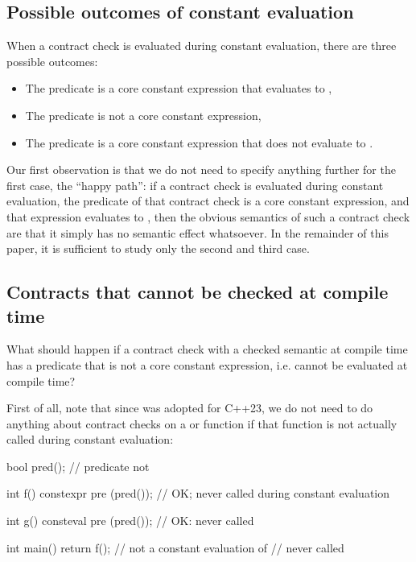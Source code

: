 \subsection{Possible outcomes of constant evaluation}

When a contract check is evaluated during constant evaluation, there are three possible outcomes:
\begin{itemize}
\item The predicate is a core constant expression that evaluates to ,
\item The predicate is not a core constant expression,
\item The predicate is a core constant expression that does not evaluate to .
\end{itemize}
Our first observation is that we do not need to specify anything further for the first case, the ``happy path'': if a contract check is evaluated during constant evaluation, the predicate of that contract check is a core constant expression, and that expression evaluates to , then the obvious semantics of such a contract check are that it simply has no semantic effect whatsoever. In the remainder of this paper, it is sufficient to study only the second and third case.

\subsection{Contracts that cannot be checked at compile time}

What should happen if a contract check with a checked semantic at compile time has a predicate that is not a core constant expression, i.e. cannot be evaluated at compile time?

First of all, note that since \cite{P2448R2} was adopted for C++23, we do not need to do anything about contract checks on a  or  function if that function is not actually called during constant evaluation:

\begin{codeblock}
bool pred();  // predicate not 

int f() constexpr
  pre (pred());  // OK; never called during constant evaluation
  
int g() consteval
  pre (pred());  // OK: never called

int main() {
  return f();  // not a constant evaluation of 
  //  never called
}
\end{codeblock}

